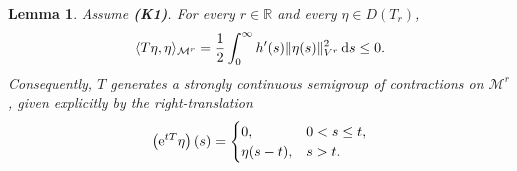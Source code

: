 \documentclass[12pt,leqno]{amsart}
\def\e{{\rm e}}
\def\d{{\rm d}}
\newtheorem{lemma}[theorem]{Lemma}
\theoremstyle{definition}
\numberwithin{equation}{section}
\numberwithin{figure}{section}
\begin{document}
\begin{lemma} \label{lem:translation-dissipation}
Assume \textbf{(K1)}. For every $r\in\mathbb R$ and every $\eta\in D(T_r)$,
\begin{equation}\label{eq:translation-diss}
\langle T\eta,\eta\rangle_{{\mathcal M^{r}}}
=\frac12\int_{0}^{\infty}h'(s)\|\eta(s)\|_{{V^r}}^{2}\,\d s\le 0.
\end{equation}
Consequently, $T$ generates a strongly continuous semigroup of contractions on ${\mathcal M^{r}}$,
given explicitly by the right-translation
\[
\left({\e^{tT}}\eta\right)(s)=
\begin{cases}
0, & 0<s\le t,\\
\eta(s-t), & s>t.
\end{cases}
\]
\end{lemma}
\end{document}
